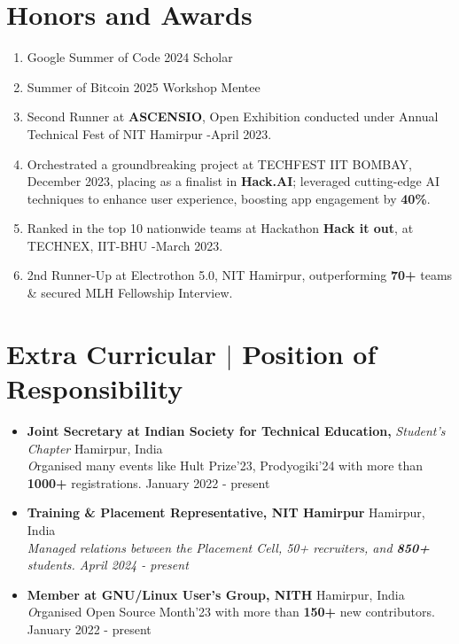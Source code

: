 \documentclass[a4,10pt]{article}
\begin{document}
\section{Honors and Awards}
\begin{enumerate}[leftmargin=*, itemsep=0em]
    \item Google Summer of Code 2024 Scholar
    \item Summer of Bitcoin 2025 Workshop Mentee
    \item Second Runner at \textbf{ASCENSIO}, Open Exhibition conducted under Annual Technical Fest of NIT Hamirpur -April 2023.
    \item Orchestrated a groundbreaking project at TECHFEST IIT BOMBAY, December 2023, placing as a finalist in \textbf{Hack.AI}; leveraged cutting-edge AI techniques to enhance user experience, boosting app engagement by \textbf{40\%}.
    \item Ranked in the top 10 nationwide teams at Hackathon \textbf{Hack it out}, at TECHNEX, IIT-BHU -March 2023.
    \item 2nd Runner-Up at Electrothon 5.0, NIT Hamirpur, outperforming \textbf{70+} teams \& secured MLH Fellowship Interview.
\end{enumerate}


\section{Extra Curricular $|$ \normalsize{Position of Responsibility}}

\begin{itemize}[leftmargin=*, itemsep=0em]
    \item \textbf {Joint Secretary at Indian Society for Technical Education,} \textit{Student's Chapter} \hfill Hamirpur, India\\
    \textit Organised many events like Hult Prize'23, Prodyogiki'24 with more than \textbf{1000+} registrations. \hfill January 2022 - present
    
    \item \textbf {Training \& Placement Representative, NIT Hamirpur} \hfill Hamirpur, India\\
    \textit{ Managed relations between the Placement Cell, 50+ recruiters, and \textbf{850+} students. \hfill April 2024 - present}
    
    \item \textbf{Member at GNU/Linux User's Group, NITH} \hfill Hamirpur, India\\
    \textit Organised Open Source Month'23 with more than \textbf{150+} new contributors. \hfill January 2022 - present
\end{itemize}
\end{document}
